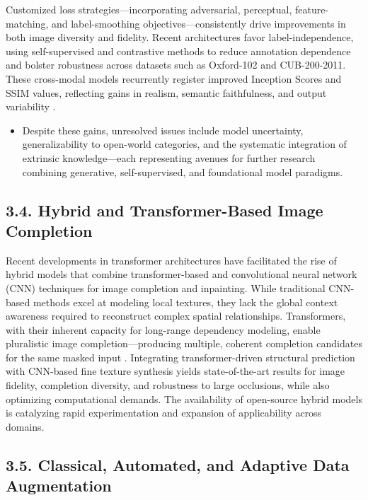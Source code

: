 \documentclass[11pt]{article}
\begin{document}
Customized loss strategies—incorporating adversarial, perceptual, feature-matching, and label-smoothing objectives—consistently drive improvements in both image diversity and fidelity. Recent architectures favor label-independence, using self-supervised and contrastive methods to reduce annotation dependence and bolster robustness across datasets such as Oxford-102 and CUB-200-2011. These cross-modal models recurrently register improved Inception Scores and SSIM values, reflecting gains in realism, semantic faithfulness, and output variability \cite{ref94, ref96, ref101}.

\begin{itemize}
    \item Despite these gains, unresolved issues include model uncertainty, generalizability to open-world categories, and the systematic integration of extrinsic knowledge—each representing avenues for further research combining generative, self-supervised, and foundational model paradigms.
\end{itemize}

\subsection{3.4. Hybrid and Transformer-Based Image Completion}

Recent developments in transformer architectures have facilitated the rise of hybrid models that combine transformer-based and convolutional neural network (CNN) techniques for image completion and inpainting. While traditional CNN-based methods excel at modeling local textures, they lack the global context awareness required to reconstruct complex spatial relationships. Transformers, with their inherent capacity for long-range dependency modeling, enable pluralistic image completion—producing multiple, coherent completion candidates for the same masked input \cite{ref92}. Integrating transformer-driven structural prediction with CNN-based fine texture synthesis yields state-of-the-art results for image fidelity, completion diversity, and robustness to large occlusions, while also optimizing computational demands. The availability of open-source hybrid models is catalyzing rapid experimentation and expansion of applicability across domains.

\subsection{3.5. Classical, Automated, and Adaptive Data Augmentation}
\end{document}
